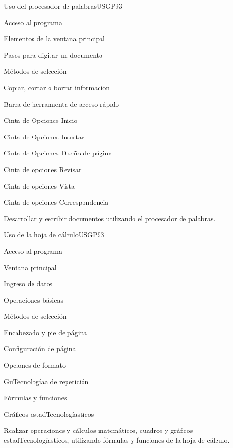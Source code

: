 \begin{syllabus}
\begin{unit}{Uso del procesador de palabras}{USGP}{9}{3}
\begin{topics}
      \item Acceso al programa
      \item Elementos de la ventana principal
      \item Pasos para digitar un documento
      \item Métodos de selección
      \item Copiar, cortar o borrar información
      \item Barra de herramienta de acceso rápido
      \item Cinta de Opciones Inicio
      \item Cinta de Opciones Insertar
      \item Cinta de Opciones Diseño de página
      \item Cinta de opciones Revisar
      \item Cinta de opciones Vista
      \item Cinta de opciones Correspondencia
\end{topics}
\begin{unitgoals}
   \item Desarrollar y escribir documentos utilizando el procesador de palabras.
\end{unitgoals}
\end{unit}

\begin{unit}{Uso de la hoja de cálculo}{USGP}{9}{3}
\begin{topics}
      \item Acceso al programa
      \item Ventana principal
      \item Ingreso de datos 
      \item Operaciones básicas 
      \item Métodos de selección 
      \item Encabezado y pie de página 
      \item Configuración de página 
      \item Opciones de formato 
      \item GuTecnologíaa de repetición
      \item Fórmulas y funciones 
      \item Gráficos estadTecnologíasticos
\end{topics}
\begin{unitgoals}
   \item Realizar operaciones y cálculos matemáticos, cuadros y gráficos estadTecnologíasticos, utilizando fórmulas y funciones de la hoja de cálculo.
\end{unitgoals}
\end{unit}


\end{syllabus}
